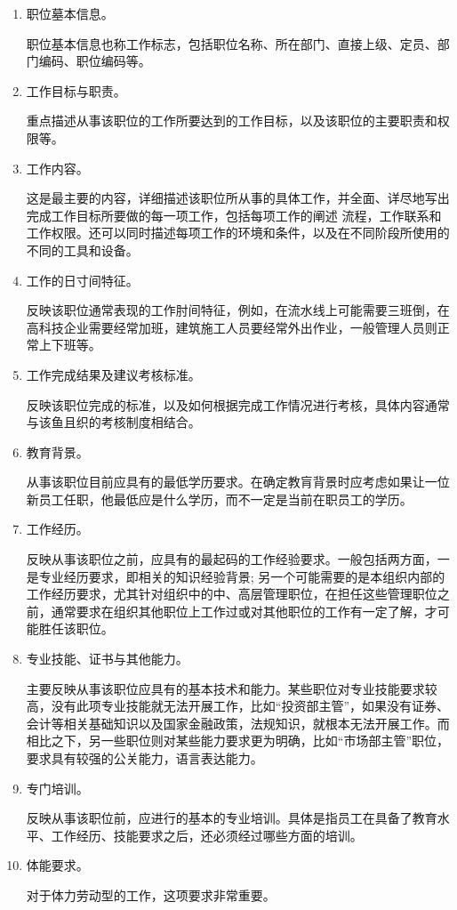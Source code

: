     \begin{enumerate}
        \item 职位墓本信息。

        职位基本信息也称工作标志，包括职位名称、所在部门、直接上级、定员、部门编码、职位编码等。

        \item 工作目标与职责。

        重点描述从事该职位的工作所要达到的工作目标，以及该职位的主要职责和权限等。

        \item 工作内容。

        这是最主要的内容，详细描述该职位所从事的具体工作，并全面、详尽地写出完成工作目标所要做的每一项工作，包括每项工作的阐述 流程，工作联系和工作权限。还可以同时描述每项工作的环境和条件，以及在不同阶段所使用的不同的工具和设备。

        \item 工作的日寸间特征。

        反映该职位通常表现的工作肘间特征，例如，在流水线上可能需要三班倒，在高科技企业需要经常加班，建筑施工人员要经常外出作业，一般管理人员则正常上下班等。

        \item 工作完成结果及建议考核标准。

        反映该职位完成的标准，以及如何根据完成工作情况进行考核，具体内容通常与该鱼且织的考核制度相结合。

        \item 教育背景。

        从事该职位目前应具有的最低学历要求。在确定教肓背景时应考虑如果让一位新员工任职，他最低应是什么学历，而不一定是当前在职员工的学历。

        \item 工作经历。

        反映从事该职位之前，应具有的最起码的工作经验要求。一般包括两方面，一是专业经历要求，即相关的知识经验背景; 另一个可能需要的是本组织内部的工作经历要求，尤其针对组织中的中、高层管理职位，在担任这些管理职位之前，通常要求在组织其他职位上工作过或对其他职位的工作有一定了解，才可能胜任该职位。

        \item 专业技能、证书与其他能力。

        主要反映从事该职位应具有的基本技术和能力。某些职位对专业技能要求较高，没有此项专业技能就无法开展工作，比如“投资部主管”，如果没有证券、会计等相关基础知识以及国家金融政策，法规知识，就根本无法开展工作。而相比之下，另一些职位则对某些能力要求更为明确，比如“市场部主管”职位，要求具有较强的公关能力，语言表达能力。

        \item 专门培训。

        反映从事该职位前，应进行的基本的专业培训。具体是指员工在具备了教育水平、工作经历、技能要求之后，还必须经过哪些方面的培训。

        \item 体能要求。

        对于体力劳动型的工作，这项要求非常重要。
    \end{enumerate}

